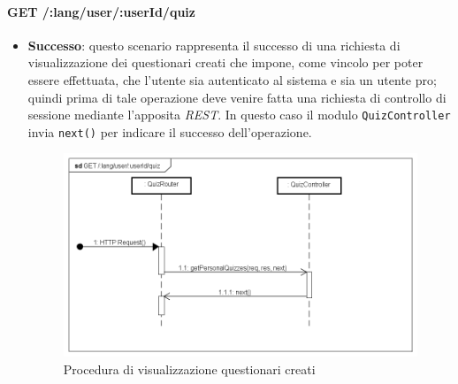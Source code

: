 \paragraph{GET /:lang/user/:userId/quiz} %
\begin{itemize}
\item \textbf{Successo}: questo scenario rappresenta il successo di una richiesta di visualizzazione dei questionari creati che impone, come vincolo per poter essere effettuata, che l'utente sia autenticato al sistema e sia un utente pro; quindi prima di tale operazione deve venire fatta una richiesta di controllo di sessione mediante l'apposita \textit{REST}. In questo caso il modulo \texttt{QuizController} invia \texttt{next()} per indicare il successo dell'operazione.
\label{Procedura di visualizzazione questionari creati}
\begin{figure}[ht]
	\centering
	\includegraphics[scale=0.40]{UML/DiagrammiDiSequenza/Back-end/GET__lang_user_userId_quiz_success.png}
	\caption{Procedura di visualizzazione questionari creati}
\end{figure}
\FloatBarrier


\end{itemize}
